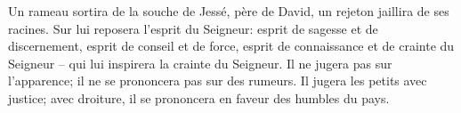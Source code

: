 Un rameau sortira de la souche de Jessé, père de David,
	un rejeton jaillira de ses racines.
Sur lui reposera l’esprit du Seigneur:
	esprit de sagesse et de discernement,
	esprit de conseil et de force,
	esprit de connaissance et de crainte du Seigneur
	– qui lui inspirera la crainte du Seigneur.
Il ne jugera pas sur l’apparence;
	il ne se prononcera pas sur des rumeurs.
Il jugera les petits avec justice;
	avec droiture, il se prononcera en faveur des humbles du pays.

